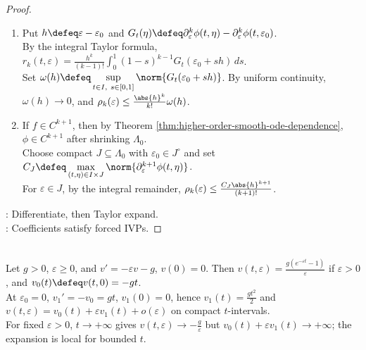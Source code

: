 \begin{proposition}
\begin{proof}
\begin{enumerate}[label=(\roman*)]
By the chain rule, $\partial_\varepsilon R_j=R_{j+1}$ for $0\leq j<k$; hence by induction, $\partial_\varepsilon^j[f(t,\phi(t,\varepsilon),\varepsilon)]=R_j(t,\varepsilon)$.\\
By differentiation under the integral sign, $z_j(t,\varepsilon)=\delta_{j0}x_0+\int_{t_0}^tR_j(s,\varepsilon)\,ds$.\\
At $\varepsilon=\varepsilon_0$, $z_j=\phi_j$, $R_j=f_j(t,\Phi_j,\varepsilon_0)$, and $z_j(t_0,\varepsilon_0)=\delta_{j0}x_0$; differentiating in $t$ proves (i).
\item Put $h\defeq\varepsilon-\varepsilon_0$ and $G_t(\eta)\defeq\partial_\varepsilon^k\phi(t,\eta)-\partial_\varepsilon^k\phi(t,\varepsilon_0)$.\\
By the integral Taylor formula, $r_k(t,\varepsilon)=\frac{h^k}{(k-1)!}\int_0^1(1-s)^{k-1}G_t(\varepsilon_0+sh)\,ds$.\\
Set $\omega(h)\defeq\sup\limits_{t\in I,\ s\in[0,1]}\norm{G_t(\varepsilon_0+sh)}$. By uniform continuity, $\omega(h)\to0$, and $\rho_k(\varepsilon)\leq\frac{\abs{h}^k}{k!}\omega(h)$.
\item If $f\in C^{k+1}$, then by Theorem \ref{thm:higher-order-smooth-ode-dependence}, $\phi\in C^{k+1}$ after shrinking $\Lambda_0$.\\
Choose compact $J\subseteq\Lambda_0$ with $\varepsilon_0\in J^\circ$ and set $C_J\defeq\max\limits_{(t,\eta)\in I\times J}\norm{\partial_\varepsilon^{k+1}\phi(t,\eta)}$.\\
For $\varepsilon\in J$, by the integral remainder, $\rho_k(\varepsilon)\leq\frac{C_J\abs{h}^{k+1}}{(k+1)!}$.
\end{enumerate}
: Differentiate, then Taylor expand.\\
: Coefficients satisfy forced IVPs.
\end{proof}
\end{proposition}

\begin{example} \label{ex:regular-perturbation-linear-drag} \\
Let $g>0$, $\varepsilon\geq0$, and $v'=-\varepsilon v-g$, $v(0)=0$. Then $v(t,\varepsilon)=\frac{g(e^{-\varepsilon t}-1)}{\varepsilon}$ if $\varepsilon>0$, and $v_0(t)\defeq v(t,0)=-gt$.\\
At $\varepsilon_0=0$, $v_1'=-v_0=gt$, $v_1(0)=0$, hence $v_1(t)=\frac{gt^2}{2}$ and $v(t,\varepsilon)=v_0(t)+\varepsilon v_1(t)+o(\varepsilon)$ on compact $t$-intervals.\\
For fixed $\varepsilon>0$, $t\to+\infty$ gives $v(t,\varepsilon)\to-\frac{g}{\varepsilon}$ but $v_0(t)+\varepsilon v_1(t)\to+\infty$; the expansion is local for bounded $t$.
\end{example}

